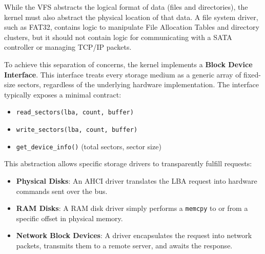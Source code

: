 \documentclass[a4paper,10pt,twoside]{report}
\theoremstyle{definition}
\begin{document}
While the VFS abstracts the logical format of data (files and directories), the kernel must also abstract the physical location of that data. A file system driver, such as FAT32, contains logic to manipulate File Allocation Tables and directory clusters, but it should not contain logic for communicating with a SATA controller or managing TCP/IP packets.

To achieve this separation of concerns, the kernel implements a \textbf{Block Device Interface}. This interface treats every storage medium as a generic array of fixed-size sectors, regardless of the underlying hardware implementation. The interface typically exposes a minimal contract:
\begin{itemize}
    \item \texttt{read\_sectors(lba, count, buffer)}
    \item \texttt{write\_sectors(lba, count, buffer)}
    \item \texttt{get\_device\_info()} (total sectors, sector size)
\end{itemize}

This abstraction allows specific storage drivers to transparently fulfill requests:
\begin{itemize}
    \item \textbf{Physical Disks}: An AHCI driver translates the LBA request into hardware commands sent over the bus.
    \item \textbf{RAM Disks}: A RAM disk driver simply performs a \texttt{memcpy} to or from a specific offset in physical memory.
    \item \textbf{Network Block Devices}: A driver encapsulates the request into network packets, transmits them to a remote server, and awaits the response.
\end{itemize}
\end{document}
